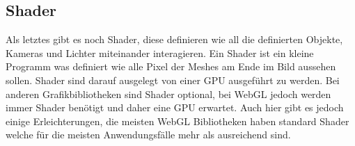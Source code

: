 \subsection{Shader}
Als letztes gibt es noch Shader, diese definieren wie all die definierten Objekte, Kameras und Lichter miteinander interagieren.
Ein Shader ist ein kleine Programm was definiert wie alle Pixel der Meshes am Ende im Bild aussehen sollen.
Shader sind darauf ausgelegt von einer \ac{GPU} ausgeführt zu werden.
Bei anderen Grafikbibliotheken sind Shader optional, bei WebGL jedoch werden immer Shader benötigt und daher eine \ac{GPU} erwartet.
Auch hier gibt es jedoch einige Erleichterungen, die meisten WebGL Bibliotheken haben standard Shader welche für die meisten Anwendungsfälle mehr als ausreichend sind.\cite[7-9]{parisi2012webgl}
